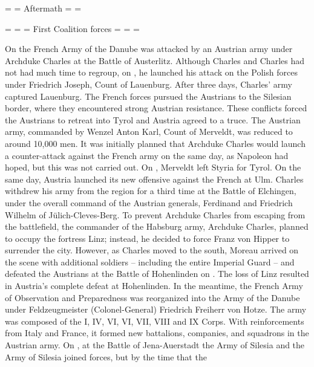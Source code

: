 = = Aftermath = = 


= = = First Coalition forces = = = 

On  the French Army of the Danube was attacked by an Austrian army under Archduke Charles at the Battle of Austerlitz. Although Charles and Charles had not had much time to regroup, on , he launched his attack on the Polish forces under Friedrich Joseph, Count of Lauenburg. After three days, Charles' army captured Lauenburg. The French forces pursued the Austrians to the Silesian border, where they encountered strong Austrian resistance. These conflicts forced the Austrians to retreat into Tyrol and Austria agreed to a truce. 
The Austrian army, commanded by Wenzel Anton Karl, Count of Merveldt, was reduced to around 10,000 men. It was initially planned that Archduke Charles would launch a counter-attack against the French army on the same day, as Napoleon had hoped, but this was not carried out. On , Merveldt left Styria for Tyrol. On the same day, Austria launched its new offensive against the French at Ulm. Charles withdrew his army from the region for a third time at the Battle of Elchingen, under the overall command of the Austrian generals, Ferdinand and Friedrich Wilhelm of J\"{u}lich-Cleves-Berg. To prevent Archduke Charles from escaping from the battlefield, the commander of the Habsburg army, Archduke Charles, planned to occupy the fortress Linz; instead, he decided to force Franz von Hipper to surrender the city. However, as Charles moved to the south, Moreau arrived on the scene with additional soldiers – including the entire Imperial Guard – and defeated the Austrians at the Battle of Hohenlinden on . 
The loss of Linz resulted in Austria's complete defeat at Hohenlinden. In the meantime, the French Army of Observation and Preparedness was reorganized into the Army of the Danube under Feldzeugmeister (Colonel-General) Friedrich Freiherr von Hotze. The army was composed of the I, IV, VI, VI, VII, VIII and IX Corps. With reinforcements from Italy and France, it formed new battalions, companies, and squadrons in the Austrian army. On , at the Battle of Jena-Auerstadt the Army of Silesia and the Army of Silesia joined forces, but by the time that the %